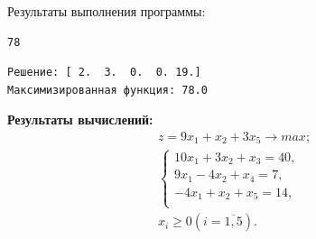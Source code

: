 \documentclass[a4paper,14pt]{extarticle}
\begin{document}
Результаты выполнения программы:
\begin{verbatim}
78
\end{verbatim}
\begin{verbatim}
Решение: [ 2.  3.  0.  0. 19.]
Максимизированная функция: 78.0
\end{verbatim}

\textbf{Результаты вычислений: }\\
\begin{equation*}
    \begin{aligned}
        z = 9x_1 + x_2 + 3x_5 \rightarrow max; \\
        \begin{cases}
            10x_1 + 3x_2 + x_3 = 40, \\
            9x_1 - 4x_2 + x_4 = 7,   \\
            -4x_1 + x_2 + x_5 = 14,  \\
        \end{cases}               \\
        x_i \geq 0 (i=\overline{1, 5}).
    \end{aligned}
\end{equation*}\\
\end{document}
